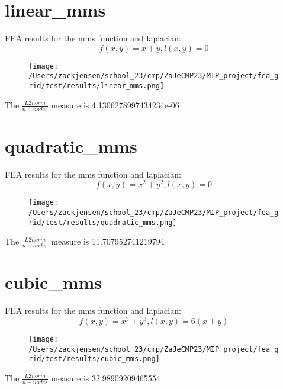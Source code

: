 \documentclass{article}%
\begin{document}
%
\normalsize%
\section{linear\_mms}%
\label{sec:linearmms}%
FEA results for the mms function and laplacian:%
\[%
f(x, y) = x + y, l(x, y) = 0%
\]%


\begin{figure}[h!]%
\centering%
\texttt{[image: /Users/zackjensen/school\_23/cmp/ZaJeCMP23/MIP\_project/fea\_grid/test/results/linear\_mms.png]}%
\end{figure}

%
The $\frac{L2 norm}{n-nodes}$ measure is 4.1306278997434234e-06

%
\newpage%
\section{quadratic\_mms}%
\label{sec:quadraticmms}%
FEA results for the mms function and laplacian:%
\[%
f(x, y) = x^2 + y^2, l(x, y) = 0%
\]%


\begin{figure}[h!]%
\centering%
\texttt{[image: /Users/zackjensen/school\_23/cmp/ZaJeCMP23/MIP\_project/fea\_grid/test/results/quadratic\_mms.png]}%
\end{figure}

%
The $\frac{L2 norm}{n-nodes}$ measure is 11.707952741219794

%
\newpage%
\section{cubic\_mms}%
\label{sec:cubicmms}%
FEA results for the mms function and laplacian:%
\[%
f(x, y) = x^3 + y^3, l(x, y) = 6(x + y)%
\]%


\begin{figure}[h!]%
\centering%
\texttt{[image: /Users/zackjensen/school\_23/cmp/ZaJeCMP23/MIP\_project/fea\_grid/test/results/cubic\_mms.png]}%
\end{figure}

%
The $\frac{L2 norm}{n-nodes}$ measure is 32.98909209465554

%
\newpage%
\end{document}
